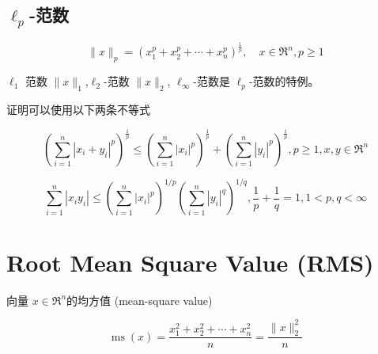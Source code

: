 \subsection{$ \ell_{p} $-范数}

\begin{definition}[$ \ell_{{p}} $-范数]
    \begin{equation} \|x\|_{p}=\left(x_{1}^{{p}}+x_{2}^{p}+\cdots+x_{n}^{p}\right)^{\frac{1}{p}}, \quad x \in \mathfrak{R}^{n}, p \ge 1 \end{equation}

    $ \ell_{1} $ 范数 $ \|x\|_{1}$,$ \ell_{2} $-范数 $ \|x\|_{2} $, $ \ell_{\infty} $-范数是 $ \ell_{p} $-范数的特例。 
\end{definition}

证明可以使用以下两条不等式

\begin{theorem}
    \begin{equation} \left(\sum_{i=1}^{n}\left|x_{i}+y_{i}\right|^{p}\right)^{\frac{1}{p}} \leq\left(\sum_{i=1}^{n}\left|x_{i}\right|^{p}\right)^{\frac{1}{p}}+\left(\sum_{i=1}^{n}\left|y_{i}\right|^{p}\right)^{\frac{1}{p}}, p \geq 1, x, y \in \mathfrak{R}^{n} \end{equation}
\end{theorem}

\begin{theorem}
    \begin{equation} \sum_{i=1}^{n}\left|x_{i} y_{i}\right| \leq\left(\sum_{i=1}^{n}\left|x_{i}\right|^{p}\right)^{1 / p}\left(\sum_{i=1}^{n}\left|y_{i}\right|^{q}\right)^{1 / q}, \frac{1}{p}+\frac{1}{q}=1,1<p, q<\infty \end{equation}
\end{theorem}

\section{Root Mean Square Value (RMS)}

\begin{definition}
    向量 $ x \in \mathfrak{R}^n $的均方值 (mean-square value)

    \begin{equation}\operatorname{ms}(x) = \frac{x_{1}^{2}+x_{2}^{2}+\cdots+x_{n}^{2}}{n}=\frac{\|x\|_{2}^{2}}{n} \end{equation}
\end{definition}


